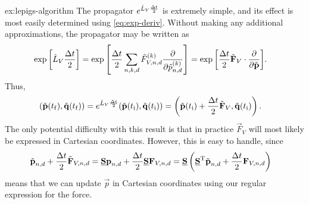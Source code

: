 \begin{DefAnswer}{ex:lepigs-algorithm}
	The propagator $e^{\hat{L}_V \frac{\Delta t}{2}}$ is extremely simple, and its effect is most easily determined using \cref{eq:exp-deriv}.
	Without making any additional approximations, the propagator may be written as
	\begin{align}
		\exp{\left[ \hat{L}_V \frac{\Delta t}{2} \right]}
		&= \exp{\left[ \frac{\Delta t}{2} \sum_{n,k,d} \tilde{F}_{V,n,d}^{(k)} \frac{\partial}{\partial \tilde{p}_{n,d}^{(k)}} \right]}
		= \exp{\left[ \frac{\Delta t}{2} \tilde{\bm{\mathbf{F}}}_{V} \cdot \frac{\partial}{\partial \tilde{\bm{\mathbf{p}}}} \right]}.
	\end{align}
	Thus,
	\begin{align}
		(\tilde{\bm{\mathbf{p}}}(t_\mathrm{f}), \tilde{\bm{\mathbf{q}}}(t_\mathrm{f}))
		&= e^{\hat{L}_V \frac{\Delta t}{2}} (\tilde{\bm{\mathbf{p}}}(t_\mathrm{i}), \tilde{\bm{\mathbf{q}}}(t_\mathrm{i}))
		= \left( \tilde{\bm{\mathbf{p}}}(t_\mathrm{i}) + \frac{\Delta t}{2} \tilde{\bm{\mathbf{F}}}_V, \tilde{\bm{\mathbf{q}}}(t_\mathrm{i}) \right).
	\end{align}
	The only potential difficulty with this result is that in practice $\vec{F}_V$ will most likely be expressed in Cartesian coordinates.
	However, this is easy to handle, since
	\begin{align}
		\tilde{\bm{\mathbf{p}}}_{n,d} + \frac{\Delta t}{2} \tilde{\bm{\mathbf{F}}}_{V,n,d}
		&= \underline{\bm{\mathbf{S}}} \bm{\mathbf{p}}_{n,d} + \frac{\Delta t}{2} \underline{\bm{\mathbf{S}}} \bm{\mathbf{F}}_{V,n,d}
		= \underline{\bm{\mathbf{S}}} \left( \underline{\bm{\mathbf{S}}}^\mathrm{T} \tilde{\bm{\mathbf{p}}}_{n,d} + \frac{\Delta t}{2} \bm{\mathbf{F}}_{V,n,d} \right)
	\end{align}
	means that we can update $\vec{p}$ in Cartesian coordinates using our regular expression for the force.


\end{DefAnswer}
